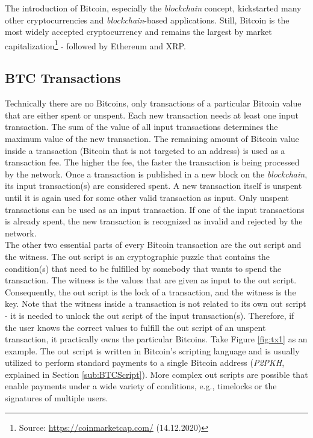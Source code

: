 \documentclass{cacthesis}
\begin{document}
        The introduction of Bitcoin, especially the \textit{blockchain} concept, kickstarted many other cryptocurrencies and \textit{blockchain}-based applications. Still, Bitcoin is the most widely accepted cryptocurrency and remains the largest by market capitalization\footnote{Source: \url{https://coinmarketcap.com/} (14.12.2020)} - followed by Ethereum and XRP.

        \subsection{BTC Transactions}
        \label{sub:BTCTx}
        
        Technically there are no Bitcoins, only transactions of a particular Bitcoin value that are either spent or unspent. Each new transaction needs at least one input transaction. The sum of the value of all input transactions determines the maximum value of the new transaction. The remaining amount of Bitcoin value inside a transaction (Bitcoin that is not targeted to an address) is used as a transaction fee. The higher the fee, the faster the transaction is being processed by the network. Once a transaction is published in a new block on the \textit{blockchain}, its input transaction(s) are considered spent. A new transaction itself is unspent until it is again used for some other valid transaction as input. Only unspent transactions can be used as an input transaction. If one of the input transactions is already spent, the new transaction is recognized as invalid and rejected by the network. \\
        The other two essential parts of every Bitcoin transaction are the out script and the witness. The out script is an cryptographic puzzle that contains the condition(s) that need to be fulfilled by somebody that wants to spend the transaction. The witness is the values that are given as input to the out script. Consequently, the out script is the lock of a transaction, and the witness is the key. Note that the witness inside a transaction is not related to its own out script - it is needed to unlock the out script of the input transaction(s). Therefore, if the user knows the correct values to fulfill the out script of an unspent transaction, it practically owns the particular Bitcoins. Take Figure \ref{fig:tx1} as an example. The out script is written in Bitcoin's scripting language and is usually utilized to perform standard payments to a single Bitcoin address (\textit{P2PKH}, explained in Section \ref{sub:BTCScript}). More complex out scripts are possible that enable payments under a wide variety of conditions, e.g., timelocks or the signatures of multiple users.
\end{document}
